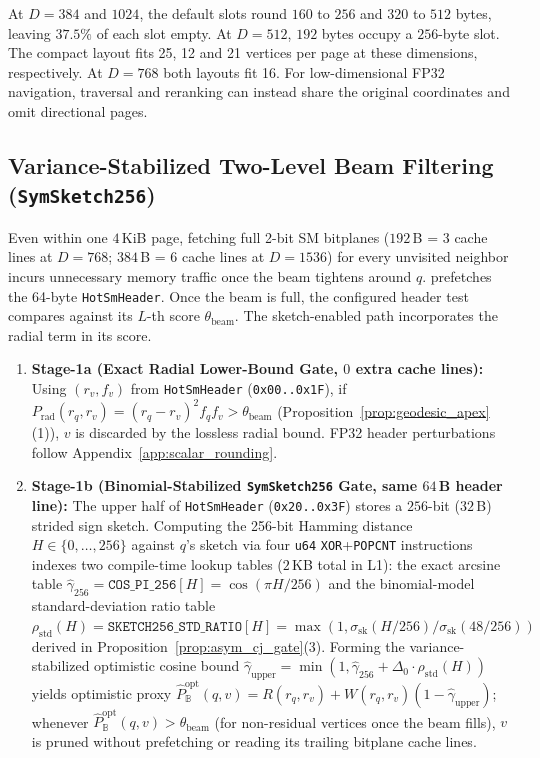 At $D=384$ and $1024$, the default slots round $160$ to $256$ and $320$ to $512$ bytes, leaving $37.5\%$ of each slot empty. At $D=512$, $192$ bytes occupy a $256$-byte slot. The compact layout fits 25, 12 and 21 vertices per page at these dimensions, respectively. At $D=768$ both layouts fit 16. For low-dimensional FP32 navigation, traversal and reranking can instead share the original coordinates and omit directional pages.
\subsection{Variance-Stabilized Two-Level Beam Filtering (\texttt{SymSketch256})}
\label{subsec:symsketch}

Even within one $4$\,KiB page, fetching full 2-bit {SM} bitplanes ($192$\,B = $3$ cache lines at $D=768$; $384$\,B = $6$ cache lines at $D=1536$) for every unvisited neighbor incurs unnecessary memory traffic once the beam tightens around $q$.
\rquiver{} prefetches the 64-byte \texttt{HotSmHeader}. Once the beam is full, the configured header test compares against its $L$-th score $\theta_{\mathrm{beam}}$. The sketch-enabled path incorporates the radial term in its score.
\begin{enumerate}
  \item \textbf{Stage-1a (Exact Radial Lower-Bound Gate, $0$ extra cache lines):}
  Using $(r_v, f_v)$ from \texttt{HotSmHeader} (\texttt{0x00..0x1F}), if $P_{\mathrm{rad}}(r_q, r_v) = (r_q - r_v)^2 f_q f_v > \theta_{\mathrm{beam}}$ (Proposition~\ref{prop:geodesic_apex}(1)), $v$ is discarded by the lossless radial bound. \ifpreprint FP32 header perturbations follow Appendix~\ref{app:scalar_rounding}.\fi

  \item \textbf{Stage-1b (Binomial-Stabilized \texttt{SymSketch256} Gate, same $64$\,B header line):}
  The upper half of \texttt{HotSmHeader} (\texttt{0x20..0x3F}) stores a $256$-bit ($32$\,B) strided sign sketch.
  Computing the 256-bit Hamming distance $H \in \{0, \dots, 256\}$ against $q$'s sketch via four \texttt{u64} \texttt{XOR}+\texttt{POPCNT} instructions indexes two compile-time lookup tables ($2$\,KB total in L1): the exact arcsine table $\hat{\gamma}_{256} = \texttt{COS\_PI\_256}[H] = \cos(\pi H / 256)$ and the binomial-model standard-deviation ratio table $\rho_{\mathrm{std}}(H) = \texttt{SKETCH256\_STD\_RATIO}[H] = \max(1, \sigma_{\mathrm{sk}}(H/256) / \sigma_{\mathrm{sk}}(48/256))$ derived in Proposition~\ref{prop:asym_cj_gate}(3).
  Forming the variance-stabilized optimistic cosine bound $\hat{\gamma}_{\mathrm{upper}} = \min(1, \hat{\gamma}_{256} + \Delta_0 \cdot \rho_{\mathrm{std}}(H))$ yields optimistic proxy $\widehat{P}_{\mathbb{B}}^{\mathrm{opt}}(q, v) = R(r_q, r_v) + W(r_q, r_v)(1 - \hat{\gamma}_{\mathrm{upper}})$; whenever $\widehat{P}_{\mathbb{B}}^{\mathrm{opt}}(q, v) > \theta_{\mathrm{beam}}$ (for non-residual vertices once the beam fills), $v$ is pruned without prefetching or reading its trailing bitplane cache lines.
\end{enumerate}
